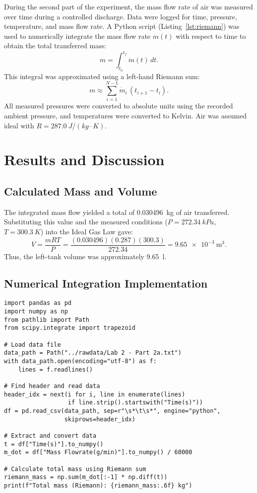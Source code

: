 \documentclass[12pt]{article}
\begin{document}
During the second part of the experiment, the mass flow rate of air was measured over time during a controlled discharge. Data were logged for time, pressure, temperature, and mass flow rate.  
A Python script (Listing~\ref{lst:riemann}) was used to numerically integrate the mass flow rate \(\dot m(t)\) with respect to time to obtain the total transferred mass:
\[
m = \int_{t_0}^{t_f} \dot m(t)\,dt.
\]
This integral was approximated using a left-hand Riemann sum:
\[
m \approx \sum_{i=1}^{N-1} \dot m_i \,(t_{i+1}-t_i).
\]
All measured pressures were converted to absolute units using the recorded ambient pressure, and temperatures were converted to Kelvin. Air was assumed ideal with \(R = 287.0~\si{J/(kg\cdot K)}\).

\section*{Results and Discussion}

\subsection*{Calculated Mass and Volume}
The integrated mass flow yielded a total of \SI{0.030496}{\kilogram} of air transferred. Substituting this value and the measured conditions (\(P = 272.34~\si{kPa}\), \(T = 300.3~\si{K}\)) into the Ideal Gas Law gave:
\[
V = \frac{mRT}{P} =
\frac{(0.030496)(0.287)(300.3)}{272.34} =
\SI{9.65e-3}{\metre\cubed}.
\]
Thus, the left-tank volume was approximately \SI{9.65}{\litre}.

\subsection*{Numerical Integration Implementation}
\begin{verbatim}
import pandas as pd
import numpy as np
from pathlib import Path
from scipy.integrate import trapezoid

# Load data file
data_path = Path("../rawdata/Lab 2 - Part 2a.txt")
with data_path.open(encoding="utf-8") as f:
    lines = f.readlines()

# Find header and read data
header_idx = next(i for i, line in enumerate(lines) 
                  if line.strip().startswith("Time(s)"))
df = pd.read_csv(data_path, sep=r"\s*\t\s*", engine="python", 
                 skiprows=header_idx)

# Extract and convert data
t = df["Time(s)"].to_numpy()
m_dot = df["Mass Flowrate(g/min)"].to_numpy() / 60000

# Calculate total mass using Riemann sum
riemann_mass = np.sum(m_dot[:-1] * np.diff(t))
print(f"Total mass (Riemann): {riemann_mass:.6f} kg")
\end{verbatim}
\end{document}
